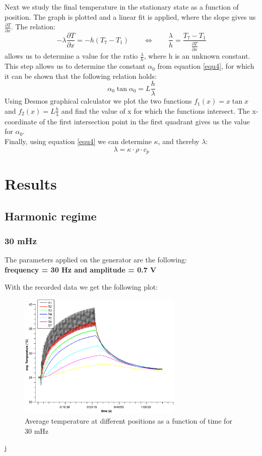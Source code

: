 \documentclass{scrartcl}
\begin{document}
Next we study the final temperature in the stationary state as a function of position. The graph is plotted and a linear fit is applied, where the slope gives us $\frac{\partial T}{\partial x}$. The relation:
\begin{equation}
  -\lambda \frac{\partial T}{\partial x}=-h(T_7-T_1)\quad\quad\Longleftrightarrow\quad\quad\frac{\lambda}{h}=\frac{T_7-T_1}{\frac{\partial T}{\partial x}}
\end{equation}
allows us to determine a value for the ratio $\frac{\lambda}{h}$, where h is an unknown constant. This step allows us to determine the constant $\alpha_0$ from equation \ref{equ4}, for which it can be shown that the following relation holds:
\begin{equation}
    \alpha_0\tan\alpha_0=L\frac{h}{\lambda}
    \label{equalpha}
\end{equation}
Using Desmos graphical calculator we plot the two functions $f_1(x)=x\tan x$ and $f_2(x)=L\frac{h}{\lambda}$ and find the value of x for which the functions intersect. The  x-coordinate of the first intersection point in the first quadrant gives us the value for $\alpha_0$.\\
Finally, using equation \ref{equ4} we can determine $\kappa$, and thereby $\lambda$:
\begin{equation}
    \lambda = \kappa\cdot\rho\cdot c_p
    \label{kappa}
\end{equation}
\section{Results}
\subsection{Harmonic regime}
\subsubsection{30 mHz}

The parameters applied on the generator are the following: \\
\textbf{frequency = 30 Hz and amplitude = 0.7 V}

With the recorded data we get the following plot:
\begin{figure}[H]
    \centering
    \includegraphics[width=0.7\textwidth]{30mHz.eps}
    \caption{Average temperature at different positions as a function of time for 30 mHz}
    \label{fig:30mHz}
\end{figure}
j
\end{document}
